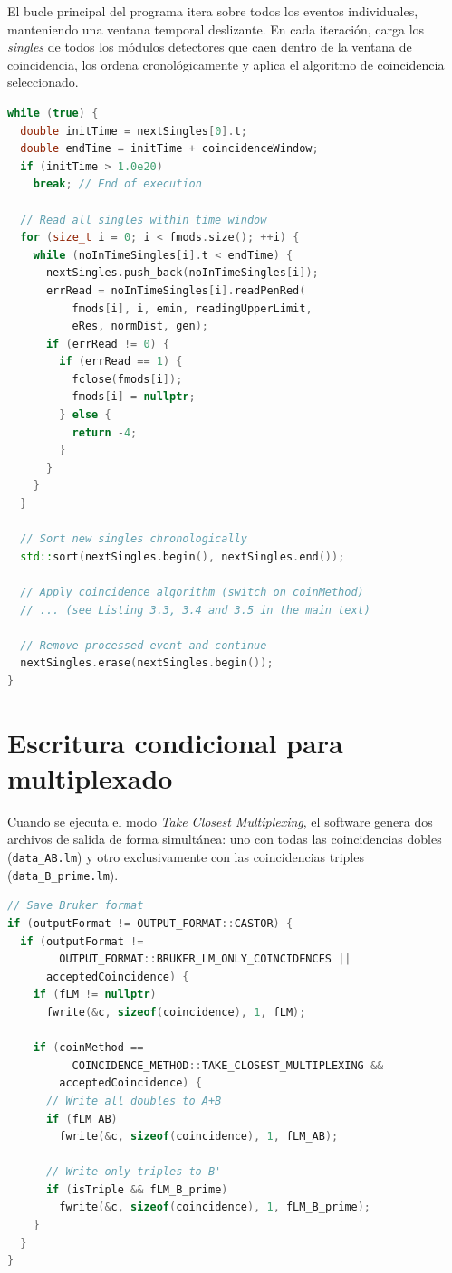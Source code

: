 El bucle principal del programa itera sobre todos los eventos individuales, manteniendo una ventana temporal deslizante. En cada iteración, carga los \textit{singles} de todos los módulos detectores que caen dentro de la ventana de coincidencia, los ordena cronológicamente y aplica el algoritmo de coincidencia seleccionado.

\begin{lstlisting}[language=C++, caption={Fragmento del bucle principal de procesado de coincidencias.}, label={lst:main_loop_annex}]
while (true) {
  double initTime = nextSingles[0].t;
  double endTime = initTime + coincidenceWindow;
  if (initTime > 1.0e20)
    break; // End of execution

  // Read all singles within time window
  for (size_t i = 0; i < fmods.size(); ++i) {
    while (noInTimeSingles[i].t < endTime) {
      nextSingles.push_back(noInTimeSingles[i]);
      errRead = noInTimeSingles[i].readPenRed(
          fmods[i], i, emin, readingUpperLimit,
          eRes, normDist, gen);
      if (errRead != 0) {
        if (errRead == 1) {
          fclose(fmods[i]);
          fmods[i] = nullptr;
        } else {
          return -4;
        }
      }
    }
  }

  // Sort new singles chronologically
  std::sort(nextSingles.begin(), nextSingles.end());

  // Apply coincidence algorithm (switch on coinMethod)
  // ... (see Listing 3.3, 3.4 and 3.5 in the main text)

  // Remove processed event and continue
  nextSingles.erase(nextSingles.begin());
}
\end{lstlisting}

\section{Escritura condicional para multiplexado}

Cuando se ejecuta el modo \textit{Take Closest Multiplexing}, el software genera dos archivos de salida de forma simultánea: uno con todas las coincidencias dobles (\texttt{data\_AB.lm}) y otro exclusivamente con las coincidencias triples (\texttt{data\_B\_prime.lm}).

\begin{lstlisting}[language=C++, caption={Escritura condicional de archivos de salida para la separación de isótopos.}, label={lst:writing_annex}]
// Save Bruker format
if (outputFormat != OUTPUT_FORMAT::CASTOR) {
  if (outputFormat !=
        OUTPUT_FORMAT::BRUKER_LM_ONLY_COINCIDENCES ||
      acceptedCoincidence) {
    if (fLM != nullptr)
      fwrite(&c, sizeof(coincidence), 1, fLM);

    if (coinMethod ==
          COINCIDENCE_METHOD::TAKE_CLOSEST_MULTIPLEXING &&
        acceptedCoincidence) {
      // Write all doubles to A+B
      if (fLM_AB)
        fwrite(&c, sizeof(coincidence), 1, fLM_AB);

      // Write only triples to B'
      if (isTriple && fLM_B_prime)
        fwrite(&c, sizeof(coincidence), 1, fLM_B_prime);
    }
  }
}
\end{lstlisting}

